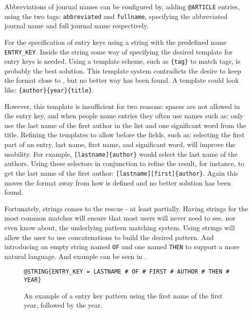 Abbreviations of journal names can be configured by, adding
\texttt{@ARTICLE} entries, using the two tags: \texttt{abbreviated}
and \texttt{fullname}, specifying the abbreviated journal name and
full journal name respectively.


For the specification of entry keys using a {\bibtex} string with the
predefined name \texttt{ENTRY\_KEY}.  Inside the string some way of
specifying the desired template for entry keys is needed.  Using a
template scheme, such as \texttt{\{tag\}} to match tags, is probably
the best solution.  This template system contradicts the desire to
keep the format close to {\bibtex}, but no better way has been found.
A template could look like: \texttt{\{author\}\{year\}\{title\}}.

However, this template is insufficient for two reasons: spaces are not
allowed in the entry key, and when people name entries they often use
names such as: only use the last name of the first author in the list
and one significant word from the title.  Refining the templates to
allow  before the fields, such as: selecting the
first part of an entry, last name, first name, and significant word,
will improve the usability.  For example,
\texttt{[lastname]\{author\}} would select the last name of the
authors.  Using these selectors in conjunction to refine the result,
for instance, to get the last name of the first author:
\texttt{[lastname][first]\{author\}}.  Again this moves the format
away from how {\bibtex} is defined and no better solution has been
found.

Fortunately, {\bibtex} strings comes to the rescue - at least
partially.  Having strings for the most common matches will ensure
that most users will never need to see, nor even know about, the
underlying pattern matching system.  Using strings will allow the user
to use concatenations to build the desired pattern.  And introducing
an empty string named \texttt{OF} and one named \texttt{THEN} to
support a more natural language.  And example can be seen in
.

\begin{figure}
  \centering
\begin{small}
\begin{verbatim}
@STRING{ENTRY_KEY = LASTNAME # OF # FIRST # AUTHOR # THEN # YEAR}
\end{verbatim}
\end{small}
  \caption{An example of a entry key pattern using the first name of
    the first year, followed by the year.}
\label{fig:analyzing_entry_key_pattern}
\end{figure}


